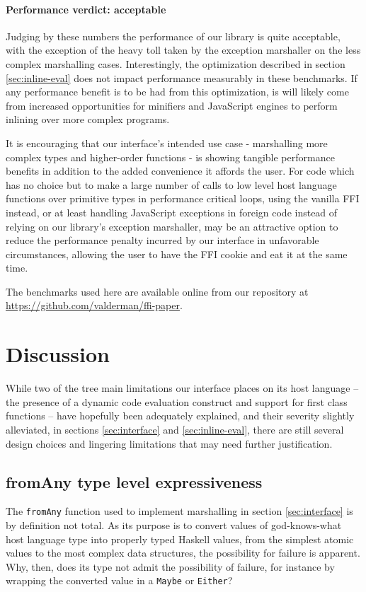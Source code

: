 \documentclass[preprint]{sigplanconf}
\begin{document}
\paragraph{Performance verdict: acceptable}
Judging by these numbers the performance of our library is quite acceptable,
with the exception of the heavy toll taken by the exception marshaller on
the less complex marshalling cases.
Interestingly, the optimization described in section \ref{sec:inline-eval}
does not impact performance measurably in these benchmarks. If any
performance benefit is to be had from this optimization, is will likely come
from increased opportunities for minifiers and JavaScript engines to perform
inlining over more complex programs.

It is encouraging that our interface's intended use case - marshalling
more complex types and higher-order functions - is showing tangible performance
benefits in addition to the added convenience it affords the user.
For code which has no choice but to make a large number of calls to
low level host language functions over primitive types in performance critical
loops, using the vanilla FFI instead, or at least handling JavaScript
exceptions in foreign code instead of relying on our library's exception
marshaller, may be an attractive option to
reduce the performance penalty incurred by our interface in unfavorable circumstances,
allowing the user to have the FFI cookie and eat it at the same time.

The benchmarks used here are available online from our repository at
\url{https://github.com/valderman/ffi-paper}.

\section{Discussion}\label{sec:discussion}
While two of the tree main limitations our interface places on its host
language -- the presence of a dynamic code evaluation construct and support for
first class functions -- have hopefully been adequately explained, and their
severity slightly alleviated, in sections \ref{sec:interface} and
\ref{sec:inline-eval}, there are still several design choices and lingering
limitations that may need further justification.

\subsection{fromAny type level expressiveness}
The \lstinline!fromAny! function used to implement marshalling in section
\ref{sec:interface} is by definition not total. As its purpose is to
convert values of god-knows-what host language type into properly typed Haskell
values, from the simplest atomic values to the most complex data structures,
the possibility for failure is apparent. Why, then, does its type not admit
the possibility of failure, for instance by wrapping the converted value in a
\lstinline!Maybe! or \lstinline!Either!?
\end{document}
